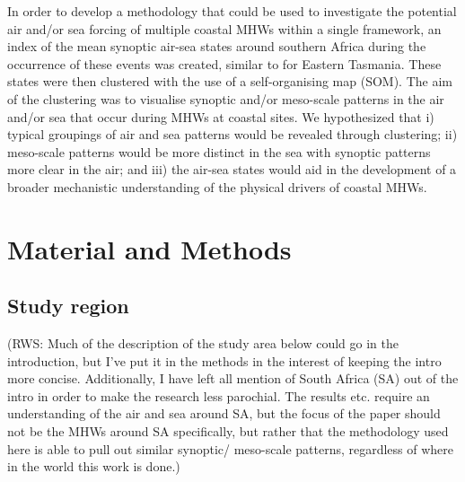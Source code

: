 \documentclass[a4paper,10pt,review]{elsarticle}
\begin{document}
In order to develop a methodology that could be used to investigate the potential air and/or sea forcing of multiple coastal MHWs within a single framework, an index of the mean synoptic air-sea states around southern Africa during the occurrence of these events was created, similar to \citet{Oliver2017atlas} for Eastern Tasmania. These states were then clustered with the use of a self-organising map (SOM). The aim of the clustering was to visualise synoptic and/or meso-scale patterns in the air and/or sea that occur during MHWs at coastal sites. We hypothesized that i) typical groupings of air and sea patterns would be revealed through clustering; ii) meso-scale patterns would be more distinct in the sea with synoptic patterns more clear in the air; and iii) the air-sea states would aid in the development of a broader mechanistic understanding of the physical drivers of coastal MHWs.

\section{Material and Methods}
\subsection{Study region}
(RWS: Much of the description of the study area below could go in the introduction, but I've put it in the methods in the interest of keeping the intro more concise. Additionally, I have left all mention of South Africa (SA) out of the intro in order to make the research less parochial. The results etc. require an understanding of the air and sea around SA, but the focus of the paper should not be the MHWs around SA specifically, but rather that the methodology used here is able to pull out similar synoptic/ meso-scale patterns, regardless of where in the world this work is done.)
\end{document}

